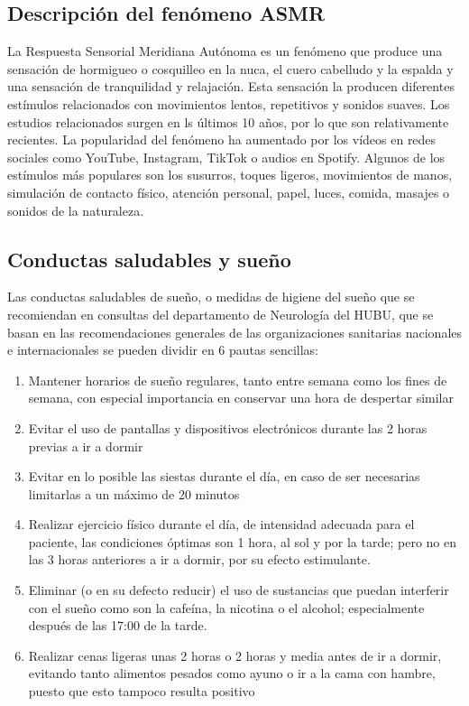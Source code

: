 \documentclass[a4paper,12pt,twoside]{memoir}
\begin{document}
\subsection{Descripción del fenómeno ASMR} La Respuesta Sensorial Meridiana Autónoma es un fenómeno que produce una sensación de hormigueo o cosquilleo en la nuca, el cuero cabelludo y la espalda y una sensación de tranquilidad y relajación. Esta sensación la producen diferentes estímulos relacionados con movimientos lentos, repetitivos y sonidos suaves. Los estudios relacionados surgen en ls últimos 10 años, por lo que son relativamente recientes. La popularidad del fenómeno ha aumentado por los vídeos en redes sociales como YouTube, Instagram, TikTok o audios en Spotify. Algunos de los estímulos más populares son los susurros, toques ligeros, movimientos de manos, simulación de contacto físico, atención personal, papel, luces, comida, masajes o sonidos de la naturaleza.
\subsection{Conductas saludables y sueño} Las conductas saludables de sueño, o medidas de higiene del sueño que se recomiendan en consultas del departamento de Neurología del HUBU, que se basan en las recomendaciones generales de las organizaciones sanitarias nacionales e internacionales se pueden dividir en 6 pautas sencillas:
\begin{enumerate}
    \item Mantener horarios de sueño regulares, tanto entre semana como los fines de semana, con especial importancia en conservar una hora de despertar similar
    \item Evitar el uso de pantallas y dispositivos electrónicos durante las 2 horas previas a ir a dormir
    \item Evitar en lo posible las siestas durante el día, en caso de ser necesarias limitarlas a un máximo de 20 minutos
    \item Realizar ejercicio físico durante el día, de intensidad adecuada para el paciente, las condiciones óptimas son 1 hora, al sol y por la tarde; pero no en las 3 horas anteriores a ir a dormir, por su efecto estimulante.
    \item Eliminar (o en su defecto reducir) el uso de sustancias que puedan interferir con el sueño como son la cafeína, la nicotina o el alcohol; especialmente después de las 17:00 de la tarde.
    \item Realizar cenas ligeras unas 2 horas o 2 horas y media antes de ir a dormir, evitando tanto alimentos pesados como ayuno o ir a la cama con hambre, puesto que esto tampoco resulta positivo
\end{enumerate}
\end{document}
